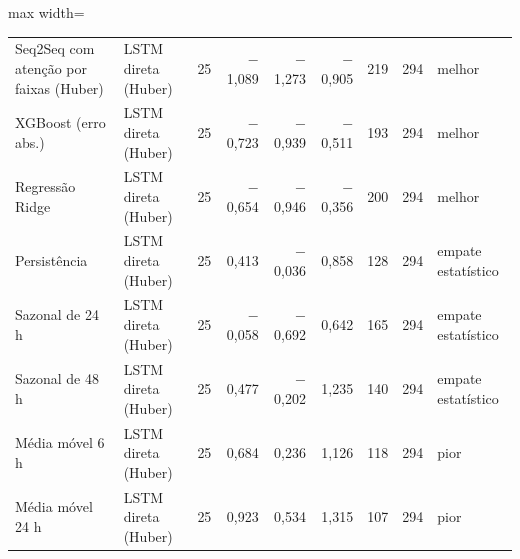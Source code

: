 \begin{table}[!htbp]
\begin{adjustbox}{max width=\textwidth}
\begin{tabular}{llrrrrrrl}
        Seq2Seq com atenção por faixas (Huber) & LSTM direta (Huber) & 25 & $-$1,089 & $-$1,273 & $-$0,905 & 219 & 294 & melhor \\
        XGBoost (erro abs.) & LSTM direta (Huber) & 25 & $-$0,723 & $-$0,939 & $-$0,511 & 193 & 294 & melhor \\
        Regressão Ridge & LSTM direta (Huber) & 25 & $-$0,654 & $-$0,946 & $-$0,356 & 200 & 294 & melhor \\
        Persistência & LSTM direta (Huber) & 25 & 0,413 & $-$0,036 & 0,858 & 128 & 294 & empate estatístico \\
        Sazonal de 24 h & LSTM direta (Huber) & 25 & $-$0,058 & $-$0,692 & 0,642 & 165 & 294 & empate estatístico \\
        Sazonal de 48 h & LSTM direta (Huber) & 25 & 0,477 & $-$0,202 & 1,235 & 140 & 294 & empate estatístico \\
        Média móvel 6 h & LSTM direta (Huber) & 25 & 0,684 & 0,236 & 1,126 & 118 & 294 & pior \\
        Média móvel 24 h & LSTM direta (Huber) & 25 & 0,923 & 0,534 & 1,315 & 107 & 294 & pior \\
        \bottomrule
    \end{tabular}
    \end{adjustbox}
\end{table}

